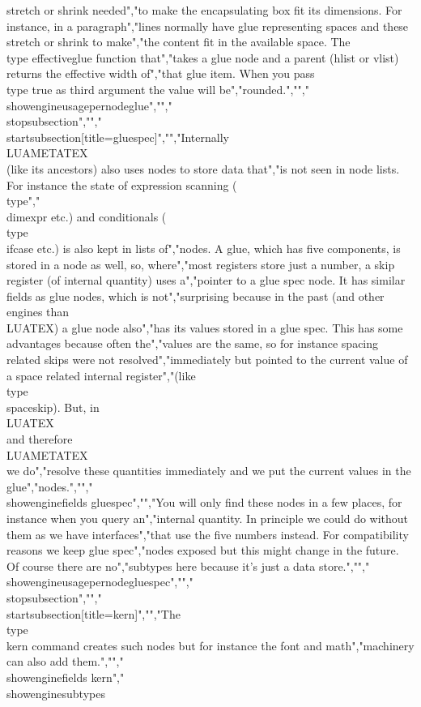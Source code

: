 stretch or shrink needed","to make the encapsulating box fit its dimensions. For instance, in a paragraph","lines normally have glue representing spaces and these stretch or shrink to make","the content fit in the available space. The \\type {effectiveglue} function that","takes a glue node and a parent (hlist or vlist) returns the effective width of","that glue item. When you pass \\type {true} as third argument the value will be","rounded.","","\\showengineusagepernode{glue}","","\\stopsubsection","","\\startsubsection[title={gluespec}]","","Internally \\LUAMETATEX\\ (like its ancestors) also uses nodes to store data that","is not seen in node lists. For instance the state of expression scanning (\\type","{\\dimexpr} etc.) and conditionals (\\type {\\ifcase} etc.) is also kept in lists of","nodes. A glue, which has five components, is stored in a node as well, so, where","most registers store just a number, a skip register (of internal quantity) uses a","pointer to a glue spec node. It has similar fields as glue nodes, which is not","surprising because in the past (and other engines than \\LUATEX) a glue node also","has its values stored in a glue spec. This has some advantages because often the","values are the same, so for instance spacing related skips were not resolved","immediately but pointed to the current value of a space related internal register","(like \\type {\\spaceskip}). But, in \\LUATEX\\ and therefore \\LUAMETATEX\\ we do","resolve these quantities immediately and we put the current values in the glue","nodes.","","\\showenginefields {gluespec}","","You will only find these nodes in a few places, for instance when you query an","internal quantity. In principle we could do without them as we have interfaces","that use the five numbers instead. For compatibility reasons we keep glue spec","nodes exposed but this might change in the future. Of course there are no","subtypes here because it's just a data store.","","\\showengineusagepernode{gluespec}","","\\stopsubsection","","\\startsubsection[title={kern}]","","The \\type {\\kern} command creates such nodes but for instance the font and math","machinery can also add them.","","\\showenginefields   {kern}","\\showenginesubtypes 